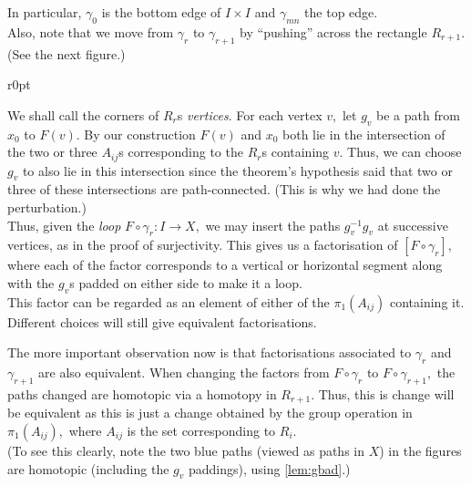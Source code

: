 \documentclass[12pt]{article}
\theoremstyle{definition}
\numberwithin{thm}{section}
\begin{document}
	In particular, $\gamma_0$ is the bottom edge of $I\times I$ and $\gamma_{mn}$ the top edge.\\
	Also, note that we move from $\gamma_r$ to $\gamma_{r+1}$ by ``pushing'' across the rectangle $R_{r+1}.$ (See the next figure.)

	\begin{wrapfigure}{r}{0pt}
		
	\end{wrapfigure}

	We shall call the corners of $R_r$s \emph{vertices}. For each vertex $v,$ let $g_v$ be a path from $x_0$ to $F(v).$ By our construction $F(v)$ and $x_0$ both lie in the intersection of the two or three $A_{ij}$s corresponding to the $R_r$s containing $v.$ Thus, we can choose $g_v$ to also lie in this intersection since the theorem's hypothesis said that two or three of these intersections are path-connected. (This is why we had done the perturbation.)\\
	Thus, given the \emph{loop} $F\circ\gamma_r:I \to X,$ we may insert the paths $g_v^{-1}g_v$ at successive vertices, as in the proof of surjectivity. This gives us a factorisation of $[F\circ\gamma_r],$ where each of the factor corresponds to a vertical or horizontal segment along with the $g_v$s padded on either side to make it a loop.\\
	This factor can be regarded as an element of either of the $\pi_1(A_{ij})$ containing it. Different choices will still give equivalent factorisations.

	The more important observation now is that factorisations associated to $\gamma_r$ and $\gamma_{r+1}$ are also equivalent. When changing the factors from $F\circ\gamma_r$ to $F\circ\gamma_{r+1},$ the paths changed are homotopic via a homotopy in $R_{r+1}.$ Thus, this is change will be equivalent as this is just a change obtained by the group operation in $\pi_1(A_{ij}),$ where $A_{ij}$ is the set corresponding to $R_i.$ \\
	(To see this clearly, note the two blue paths (viewed as paths in $X$) in the figures are homotopic (including the $g_v$ paddings), using \cref{lem:gbad}.)
\end{document}
